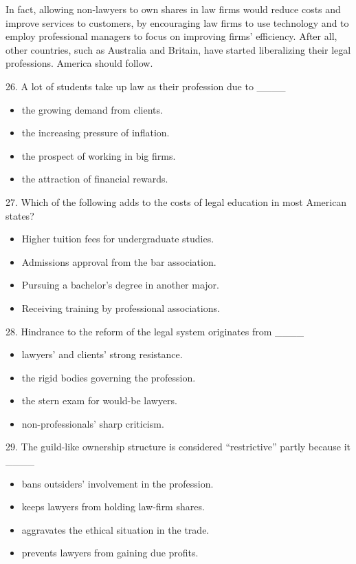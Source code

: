 \documentclass[UTF8,11pt]{ctexart}
\begin{document}
In fact, allowing non-lawyers to own shares in law firms would reduce costs and improve services to customers, by encouraging law firms to use technology and to employ professional managers to focus on improving firms’ efficiency. After all, other countries, such as Australia and Britain, have started liberalizing their legal professions. America should follow.


26. A lot of students take up law as their profession due to \_\_\_\_


\begin{itemize}[leftmargin=2em,itemsep=.2em,topsep=.4em]\item[A.] the growing demand from clients.
\item[B.] the increasing pressure of inflation.
\item[C.] the prospect of working in big firms.
\item[D.] the attraction of financial rewards.
\end{itemize}

27. Which of the following adds to the costs of legal education in most American states?


\begin{itemize}[leftmargin=2em,itemsep=.2em,topsep=.4em]\item[A.] Higher tuition fees for undergraduate studies.
\item[B.] Admissions approval from the bar association.
\item[C.] Pursuing a bachelor’s degree in another major.
\item[D.] Receiving training by professional associations.
\end{itemize}

28. Hindrance to the reform of the legal system originates from \_\_\_\_


\begin{itemize}[leftmargin=2em,itemsep=.2em,topsep=.4em]\item[A.] lawyers’ and clients’ strong resistance.
\item[B.] the rigid bodies governing the profession.
\item[C.] the stern exam for would-be lawyers.
\item[D.] non-professionals’ sharp criticism.
\end{itemize}

29. The guild-like ownership structure is considered “restrictive” partly because it \_\_\_\_


\begin{itemize}[leftmargin=2em,itemsep=.2em,topsep=.4em]\item[A.] bans outsiders’ involvement in the profession.
\item[B.] keeps lawyers from holding law-firm shares.
\item[C.] aggravates the ethical situation in the trade.
\item[D.] prevents lawyers from gaining due profits.
\end{itemize}
\end{document}
